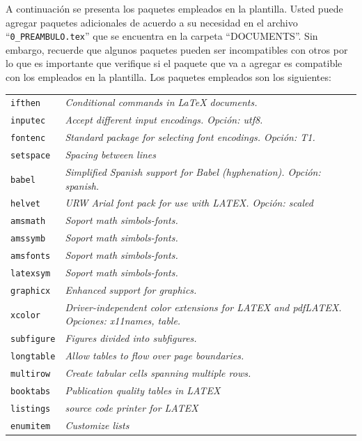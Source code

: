 A continuación se presenta los paquetes empleados en la plantilla. Usted puede agregar paquetes adicionales de acuerdo a su necesidad en el archivo ``\lstinline|0_PREAMBULO.tex|'' que se encuentra en la carpeta ``DOCUMENTS''. Sin embargo, recuerde que algunos paquetes pueden ser incompatibles con otros por lo que es importante que verifique si el paquete que va a agregar es compatible con los empleados en la plantilla. Los paquetes empleados son los siguientes: 

\begin{longtable}{p{} p{}}
	\texttt{ifthen}  	& \textit{Conditional commands in LaTeX documents.}  \\  
	\texttt{inputec} 	& \textit{Accept different input encodings. Opción: utf8.} \\ 
	\texttt{fontenc} 	& \textit{Standard package for selecting font encodings. Opción: T1.} \\
	\texttt{setspace}   & \textit{Spacing between lines} \\ 
	\texttt{babel} 	 	& \textit{Simplified Spanish support for Babel (hyphenation). Opción: spanish.} \\
	\texttt{helvet}  	& \textit{URW Arial font pack for use with LATEX. Opción: scaled}\\
	\texttt{amsmath} 	& \textit{Soport math simbols-fonts.} \\
	\texttt{amssymb}    & \textit{Soport math simbols-fonts.}\\
	\texttt{amsfonts} 	& \textit{Soport math simbols-fonts.}\\
	\texttt{latexsym} 	& \textit{Soport math simbols-fonts.}\\
	\texttt{graphicx} 	& \textit{Enhanced support for graphics.}\\
	\texttt{xcolor} 	& \textit{Driver-independent color extensions for LATEX and pdfLATEX. Opciones: x11names, table.} \\
	\texttt{subfigure} 	& \textit{Figures divided into subfigures.} \\
	\texttt{longtable} 	& \textit{Allow tables to flow over page boundaries.} \\
	\texttt{multirow}  	& \textit{Create tabular cells spanning multiple rows.} \\
	\texttt{booktabs} 	& \textit{Publication quality tables in LATEX} \\
	\texttt{listings} 	& \textit{source code printer for LATEX }	 \\
	\texttt{enumitem} 	& \textit{Customize lists} \\

\end{longtable}
